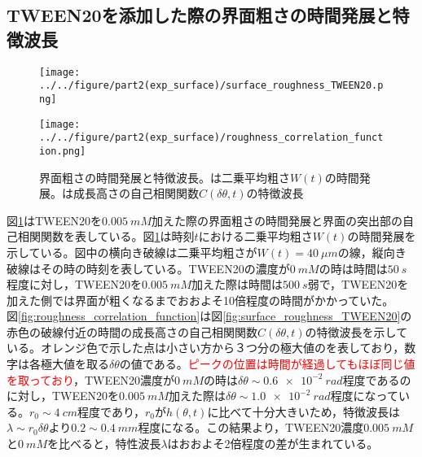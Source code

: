 \documentclass[autodetect-engine,dvi=dvipdfmx,a4paper,ja=standard,oneside,openany,11pt,draft]{bxjsbook}
\begin{document}
\subsection{TWEEN20を添加した際の界面粗さの時間発展と特徴波長}
\begin{figure}[htbp]
  \begin{minipage}{0.4\textwidth}
    \subcaption{}
    \centering
    \texttt{[image: ../../figure/part2(exp\_surface)/surface\_roughness\_TWEEN20.png]}
    \label{fig:surface_roughness_TWEEN20}
  \end{minipage}
  \begin{minipage}{0.58\textwidth}
    \subcaption{}
    \centering
    \texttt{[image: ../../figure/part2(exp\_surface)/roughness\_correlation\_function.png]}
    \label{fig:roughness_correlation_function}
  \end{minipage}
  \caption{界面粗さの時間発展と特徴波長。は二乗平均粗さ$W(t)$の時間発展。は成長高さの自己相関関数$C(\delta\theta,t)$の特徴波長}
  \label{fig:surface_roughness}
\end{figure}
図\ref{fig:surface_roughness}はTWEEN20を$\SI{0.005}{mM}$加えた際の界面粗さの時間発展と界面の突出部の自己相関関数を表している。図\ref{fig:surface_roughness}は時刻$t$における二乗平均粗さ$W(t)$の時間発展を示している。図中の横向き破線は二乗平均粗さが$W(t)=\SI{40}{\mu m}$の線，縦向き破線はその時の時刻を表している。TWEEN20の濃度が$\SI{0}{mM}$の時は時間は$\SI{50}{s}$程度に対し，TWEEN20を$\SI{0.005}{mM}$加えた際は時間は$\SI{500}{s}$弱で，TWEEN20を加えた側では界面が粗くなるまでおおよそ10倍程度の時間がかかっていた。\\
図\ref{fig:roughness_correlation_function}は図\ref{fig:surface_roughness_TWEEN20}の赤色の破線付近の時間の成長高さの自己相関関数$C(\delta\theta,t)$の特徴波長を示している。オレンジ色で示した点は小さい方から３つ分の極大値のを表しており，数字は各極大値を取る$\delta \theta$の値である。\textcolor{red}{ピークの位置は時間が経過してもほぼ同じ値を取っており}，TWEEN20濃度が$\SI{0}{mM}$の時は$\delta\theta\sim\SI{0.6e-2}{rad}$程度であるのに対し，TWEEN20を$\SI{0.005}{mM}$加えた際は$\delta\theta\sim\SI{1.0e-2}{rad}$程度になっている。$r_0\sim\SI{4}{cm}$程度であり，$r_0$が$h(\theta,t)$に比べて十分大きいため，特徴波長は$\lambda\sim r_0\delta\theta$より$0.2\sim\SI{0.4}{mm}$程度になる。この結果より，TWEEN20濃度$\SI{0.005}{mM}$と$\SI{0}{mM}$を比べると，特性波長$\lambda$はおおよそ2倍程度の差が生まれている。\\
\end{document}
